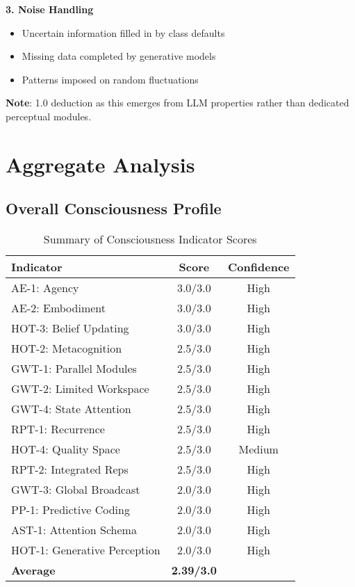 \documentclass[12pt,a4paper]{article}
\begin{document}
\textbf{3. Noise Handling}
\begin{itemize}
    \item Uncertain information filled in by class defaults
    \item Missing data completed by generative models
    \item Patterns imposed on random fluctuations
\end{itemize}

\textbf{Note}: 1.0 deduction as this emerges from LLM properties rather than dedicated perceptual modules.

\section{Aggregate Analysis}

\subsection{Overall Consciousness Profile}

\begin{table}[H]
\centering
\caption{Summary of Consciousness Indicator Scores}
\begin{tabular}{lcc}
\toprule
\textbf{Indicator} & \textbf{Score} & \textbf{Confidence} \\
\midrule
AE-1: Agency & 3.0/3.0 & High \\
AE-2: Embodiment & 3.0/3.0 & High \\
HOT-3: Belief Updating & 3.0/3.0 & High \\
HOT-2: Metacognition & 2.5/3.0 & High \\
GWT-1: Parallel Modules & 2.5/3.0 & High \\
GWT-2: Limited Workspace & 2.5/3.0 & High \\
GWT-4: State Attention & 2.5/3.0 & High \\
RPT-1: Recurrence & 2.5/3.0 & High \\
HOT-4: Quality Space & 2.5/3.0 & Medium \\
RPT-2: Integrated Reps & 2.5/3.0 & High \\
GWT-3: Global Broadcast & 2.0/3.0 & High \\
PP-1: Predictive Coding & 2.0/3.0 & High \\
AST-1: Attention Schema & 2.0/3.0 & High \\
HOT-1: Generative Perception & 2.0/3.0 & High \\
\midrule
\textbf{Average} & \textbf{2.39/3.0} & \\
\bottomrule
\end{tabular}
\end{table}
\end{document}
